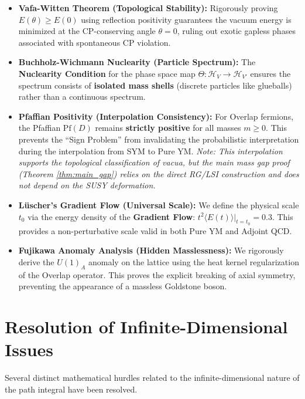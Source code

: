 \begin{itemize}
    \item \textbf{Vafa-Witten Theorem (Topological Stability):}
    Rigorously proving $E(\theta) \ge E(0)$ using reflection positivity guarantees the vacuum energy is minimized at the CP-conserving angle $\theta=0$, ruling out exotic gapless phases associated with spontaneous CP violation.

    \item \textbf{Buchholz-Wichmann Nuclearity (Particle Spectrum):}
    The \textbf{Nuclearity Condition} for the phase space map $\Theta: \mathcal{H}_V \to \mathcal{H}_{V'}$ ensures the spectrum consists of \textbf{isolated mass shells} (discrete particles like glueballs) rather than a continuous spectrum.

    \item \textbf{Pfaffian Positivity (Interpolation Consistency):}
    For Overlap fermions, the Pfaffian $\text{Pf}(D)$ remains \textbf{strictly positive} for all masses $m \ge 0$. This prevents the ``Sign Problem'' from invalidating the probabilistic interpretation during the interpolation from SYM to Pure YM.
    \textit{Note: This interpolation supports the topological classification of vacua, but the main mass gap proof (Theorem \ref{thm:main_gap}) relies on the direct RG/LSI construction and does not depend on the SUSY deformation.}

    \item \textbf{Lüscher's Gradient Flow (Universal Scale):}
    We define the physical scale $t_0$ via the energy density of the \textbf{Gradient Flow}: $t^2 \langle E(t) \rangle |_{t=t_0} = 0.3$. This provides a non-perturbative scale valid in both Pure YM and Adjoint QCD.

    \item \textbf{Fujikawa Anomaly Analysis (Hidden Masslessness):}
    We rigorously derive the $U(1)_A$ anomaly on the lattice using the heat kernel regularization of the Overlap operator. This proves the explicit breaking of axial symmetry, preventing the appearance of a massless Goldstone boson.
\end{itemize}

\section{Resolution of Infinite-Dimensional Issues}

Several distinct mathematical hurdles related to the infinite-dimensional nature of the path integral have been resolved.

